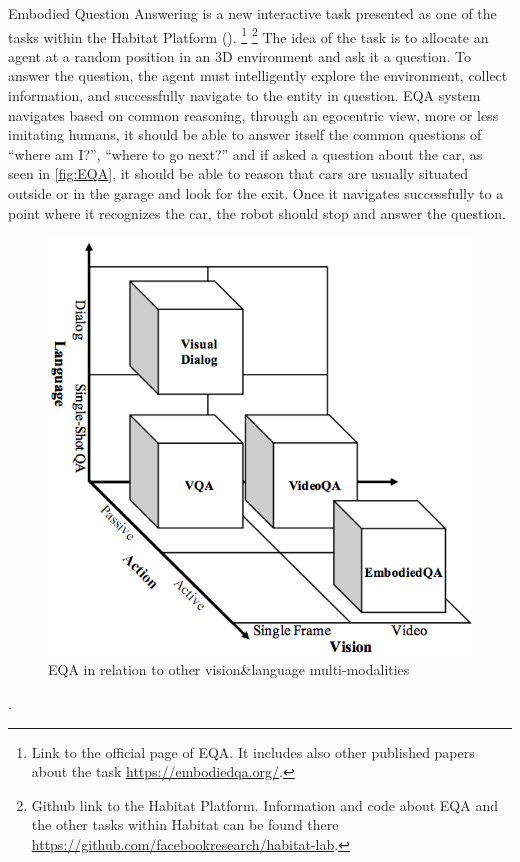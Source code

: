 Embodied Question Answering is a new interactive task presented as one of the tasks within the Habitat Platform (\cite{embodiedqa}). \footnote{Link to the official page of EQA. It includes also other published papers about the task \url{https://embodiedqa.org/}.} \footnote{Github link to the Habitat Platform. Information and code about EQA and the other tasks within Habitat can be found there \url{https://github.com/facebookresearch/habitat-lab}.} The idea of the task is to allocate an agent at a random position in an  3D environment and ask it a question. To answer the question, the agent must intelligently explore the environment, collect information, and successfully navigate to the entity in question. EQA system navigates based on common reasoning, through an egocentric view, more or less imitating humans, it should be able to answer itself the common questions of “where am I?”, “where to go next?” and if asked a question about the car, as seen in \ref{fig:EQA}, it should be able to reason that cars are usually situated outside or in the garage and look for the exit. Once it navigates successfully to a point where it recognizes the car, the robot should stop and answer the question.  


\begin{figure}[H]
\centering
\includegraphics[scale=0.3]{images/Vision-language.png}
\caption{EQA in relation to other vision\&language multi-modalities}
\label{fig:multimodal}
\end{figure}.


